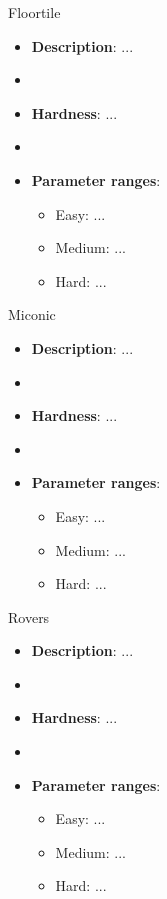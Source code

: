 \documentclass[aspectratio=169,xcolor=dvipsnames]{beamer}
\begin{document}
\begin{frame}{Floortile}

    \begin{itemize}
        \item \textbf{Description}: ...
        \item[]
        \item \textbf{Hardness}: ...
        \item[]
        \item \textbf{Parameter ranges}:
        \begin{itemize}
            \item Easy: ...
            \item Medium: ...
            \item Hard: ...
        \end{itemize}
    \end{itemize}

\end{frame}


\begin{frame}{Miconic}

    \begin{itemize}
        \item \textbf{Description}: ...
        \item[]
        \item \textbf{Hardness}: ...
        \item[]
        \item \textbf{Parameter ranges}:
        \begin{itemize}
            \item Easy: ...
            \item Medium: ...
            \item Hard: ...
        \end{itemize}
    \end{itemize}

\end{frame}


\begin{frame}{Rovers}

    \begin{itemize}
        \item \textbf{Description}: ...
        \item[]
        \item \textbf{Hardness}: ...
        \item[]
        \item \textbf{Parameter ranges}:
        \begin{itemize}
            \item Easy: ...
            \item Medium: ...
            \item Hard: ...
        \end{itemize}
    \end{itemize}

\end{frame}
\end{document}
